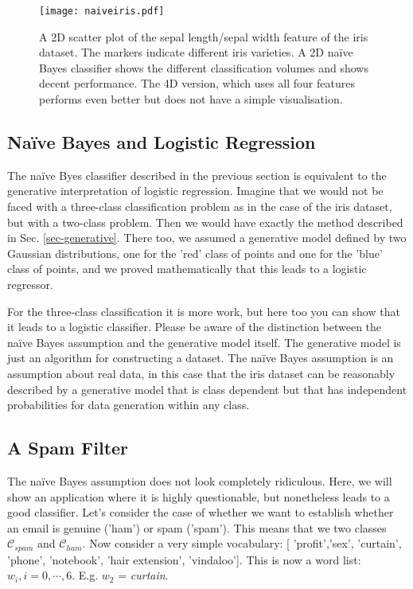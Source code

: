 \begin{figure}
  \begin{center}
    \texttt{[image: naiveiris.pdf]}
    \caption{A 2D scatter plot of the sepal length/sepal width feature of the iris dataset. The markers indicate different iris varieties. A 2D na\"ive Bayes classifier
      shows the different classification volumes and shows decent performance. The 4D version, which uses all four features performs even better but does not have
      a simple visualisation.}
    \label{fig-naiveiris}
    \end{center}
  
\end{figure}

\subsection{Na\"ive Bayes and Logistic Regression}
The na\"ive Byes classifier described in the previous section is equivalent to the generative interpretation of logistic regression. Imagine that we would not be faced
with a three-class classification problem as in the case of the iris dataset, but with a two-class problem. Then we would have exactly the method described in Sec.
\ref{sec-generative}. There too, we assumed a generative model defined by two Gaussian distributions, one for the 'red' class of points and one for the 'blue' class of points,
and we proved mathematically that this leads to a logistic regressor.

For the three-class classification it is more work, but here too you can show that it leads to a logistic classifier. Please be aware of the distinction between the
na\"ive Bayes assumption and the generative model itself. The generative model is just an algorithm for constructing a dataset. The na\"ive Bayes assumption is an assumption about real data, in this case that the iris dataset can be reasonably described by a generative model that is class dependent but that has independent probabilities for
data generation within any class.

\subsection{A Spam Filter}
The na\"ive Bayes assumption does not look completely ridiculous. Here, we will show an application where it is highly questionable, but nonetheless leads to a
good classifier.
Let's consider the case of whether we want to establish whether an email is genuine ('ham') or spam ('spam'). This means that we two classes $\mathcal{C}_{spam}$ and $\mathcal{C}_{ham}$. Now consider a very simple vocabulary:
[ 'profit','sex', 'curtain', 'phone', 'notebook', 'hair extension', 'vindaloo']. This is now a word list:
$w_i, i = 0, \cdots, 6$. E.g. $w_2$ = \emph{curtain}.



